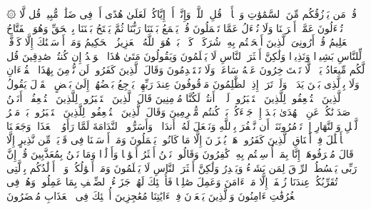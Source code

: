 \stopbuffer
\startbuffer[\q:34:24]
۞ قُلۡ مَن یَرۡزُقُكُم مِّنَ ٱلسَّمَٰوَٰتِ وَٱلۡأَرۡضِۖ قُلِ ٱللَّهُۖ وَإِنَّاۤ أَوۡ إِیَّاكُمۡ لَعَلَىٰ هُدًى أَوۡ فِی ضَلَٰلࣲ مُّبِینࣲ%
\stopbuffer
\startbuffer[\q:34:25]
قُل لَّا تُسۡءَلُونَ عَمَّاۤ أَجۡرَمۡنَا وَلَا نُسۡءَلُ عَمَّا تَعۡمَلُونَ%
\stopbuffer
\startbuffer[\q:34:26]
قُلۡ یَجۡمَعُ بَیۡنَنَا رَبُّنَا ثُمَّ یَفۡتَحُ بَیۡنَنَا بِٱلۡحَقِّ وَهُوَ ٱلۡفَتَّاحُ ٱلۡعَلِیمُ%
\stopbuffer
\startbuffer[\q:34:27]
قُلۡ أَرُونِیَ ٱلَّذِینَ أَلۡحَقۡتُم بِهِۦ شُرَكَاۤءَۖ كَلَّاۚ بَلۡ هُوَ ٱللَّهُ ٱلۡعَزِیزُ ٱلۡحَكِیمُ%
\stopbuffer
\startbuffer[\q:34:28]
وَمَاۤ أَرۡسَلۡنَٰكَ إِلَّا كَاۤفَّةࣰ لِّلنَّاسِ بَشِیرࣰا وَنَذِیرࣰا وَلَٰكِنَّ أَكۡثَرَ ٱلنَّاسِ لَا یَعۡلَمُونَ%
\stopbuffer
\startbuffer[\q:34:29]
وَیَقُولُونَ مَتَىٰ هَٰذَا ٱلۡوَعۡدُ إِن كُنتُمۡ صَٰدِقِینَ%
\stopbuffer
\startbuffer[\q:34:30]
قُل لَّكُم مِّیعَادُ یَوۡمࣲ لَّا تَسۡتَءۡخِرُونَ عَنۡهُ سَاعَةࣰ وَلَا تَسۡتَقۡدِمُونَ%
\stopbuffer
\startbuffer[\q:34:31]
وَقَالَ ٱلَّذِینَ كَفَرُوا۟ لَن نُّؤۡمِنَ بِهَٰذَا ٱلۡقُرۡءَانِ وَلَا بِٱلَّذِی بَیۡنَ یَدَیۡهِۗ وَلَوۡ تَرَىٰۤ إِذِ ٱلظَّٰلِمُونَ مَوۡقُوفُونَ عِندَ رَبِّهِمۡ یَرۡجِعُ بَعۡضُهُمۡ إِلَىٰ بَعۡضٍ ٱلۡقَوۡلَ یَقُولُ ٱلَّذِینَ ٱسۡتُضۡعِفُوا۟ لِلَّذِینَ ٱسۡتَكۡبَرُوا۟ لَوۡلَاۤ أَنتُمۡ لَكُنَّا مُؤۡمِنِینَ%
\stopbuffer
\startbuffer[\q:34:32]
قَالَ ٱلَّذِینَ ٱسۡتَكۡبَرُوا۟ لِلَّذِینَ ٱسۡتُضۡعِفُوۤا۟ أَنَحۡنُ صَدَدۡنَٰكُمۡ عَنِ ٱلۡهُدَىٰ بَعۡدَ إِذۡ جَاۤءَكُمۖ بَلۡ كُنتُم مُّجۡرِمِینَ%
\stopbuffer
\startbuffer[\q:34:33]
وَقَالَ ٱلَّذِینَ ٱسۡتُضۡعِفُوا۟ لِلَّذِینَ ٱسۡتَكۡبَرُوا۟ بَلۡ مَكۡرُ ٱلَّیۡلِ وَٱلنَّهَارِ إِذۡ تَأۡمُرُونَنَاۤ أَن نَّكۡفُرَ بِٱللَّهِ وَنَجۡعَلَ لَهُۥۤ أَندَادࣰاۚ وَأَسَرُّوا۟ ٱلنَّدَامَةَ لَمَّا رَأَوُا۟ ٱلۡعَذَابَۚ وَجَعَلۡنَا ٱلۡأَغۡلَٰلَ فِیۤ أَعۡنَاقِ ٱلَّذِینَ كَفَرُوا۟ۖ هَلۡ یُجۡزَوۡنَ إِلَّا مَا كَانُوا۟ یَعۡمَلُونَ%
\stopbuffer
\startbuffer[\q:34:34]
وَمَاۤ أَرۡسَلۡنَا فِی قَرۡیَةࣲ مِّن نَّذِیرٍ إِلَّا قَالَ مُتۡرَفُوهَاۤ إِنَّا بِمَاۤ أُرۡسِلۡتُم بِهِۦ كَٰفِرُونَ%
\stopbuffer
\startbuffer[\q:34:35]
وَقَالُوا۟ نَحۡنُ أَكۡثَرُ أَمۡوَٰلࣰا وَأَوۡلَٰدࣰا وَمَا نَحۡنُ بِمُعَذَّبِینَ%
\stopbuffer
\startbuffer[\q:34:36]
قُلۡ إِنَّ رَبِّی یَبۡسُطُ ٱلرِّزۡقَ لِمَن یَشَاۤءُ وَیَقۡدِرُ وَلَٰكِنَّ أَكۡثَرَ ٱلنَّاسِ لَا یَعۡلَمُونَ%
\stopbuffer
\startbuffer[\q:34:37]
وَمَاۤ أَمۡوَٰلُكُمۡ وَلَاۤ أَوۡلَٰدُكُم بِٱلَّتِی تُقَرِّبُكُمۡ عِندَنَا زُلۡفَىٰۤ إِلَّا مَنۡ ءَامَنَ وَعَمِلَ صَٰلِحࣰا فَأُو۟لَٰۤئِكَ لَهُمۡ جَزَاۤءُ ٱلضِّعۡفِ بِمَا عَمِلُوا۟ وَهُمۡ فِی ٱلۡغُرُفَٰتِ ءَامِنُونَ%
\stopbuffer
\startbuffer[\q:34:38]
وَٱلَّذِینَ یَسۡعَوۡنَ فِیۤ ءَایَٰتِنَا مُعَٰجِزِینَ أُو۟لَٰۤئِكَ فِی ٱلۡعَذَابِ مُحۡضَرُونَ%
\stopbuffer

